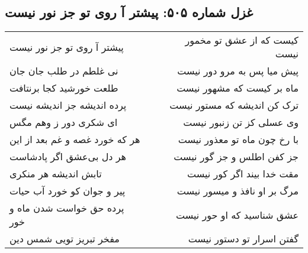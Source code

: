 \begin{center}
\section*{غزل شماره ۵۰۵: پیشتر آ روی تو جز نور نیست}
\label{sec:0505}
\begin{longtable}{l p{0.5cm} r}
پیشتر آ روی تو جز نور نیست
&&
کیست که از عشق تو مخمور نیست
\\
نی غلطم در طلب جان جان
&&
پیش میا پس به مرو دور نیست
\\
طلعت خورشید کجا برنتافت
&&
ماه بر کیست که مشهور نیست
\\
پرده اندیشه جز اندیشه نیست
&&
ترک کن اندیشه که مستور نیست
\\
ای شکری دور ز وهم مگس
&&
وی عسلی کز تن زنبور نیست
\\
هر که خورد غصه و غم بعد از این
&&
با رخ چون ماه تو معذور نیست
\\
هر دل بی‌عشق اگر پادشاست
&&
جز کفن اطلس و جز گور نیست
\\
تابش اندیشه هر منکری
&&
مقت خدا بیند اگر کور نیست
\\
پیر و جوان کو خورد آب حیات
&&
مرگ بر او نافذ و میسور نیست
\\
پرده حق خواست شدن ماه و خور
&&
عشق شناسید که او حور نیست
\\
مفخر تبریز تویی شمس دین
&&
گفتن اسرار تو دستور نیست
\\
\end{longtable}
\end{center}
